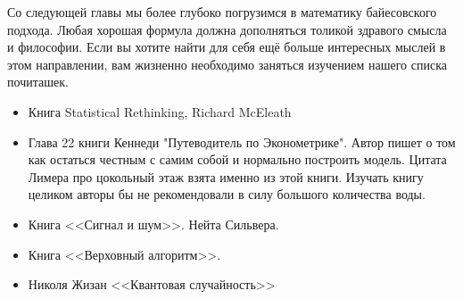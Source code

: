 \documentclass[12pt, a4paper, oneside]{extreport}
\theoremstyle{plain}              %
\theoremstyle{definition}         %
\begin{document}
Со следующей главы мы более глубоко погрузимся в математику байесовского подхода. Любая хорошая формула должна дополняться толикой здравого смысла и философии. Если вы хотите найти для себя ещё больше интересных мыслей в этом направлении, вам жизненно необходимо заняться изучением нашего списка почиташек.


\begin{itemize}

\item   Книга Statistical Rethinking, Richard McEleath

\item  Глава 22 книги Кеннеди "Путеводитель по Эконометрике". Автор пишет о том как остаться честным с самим собой и нормально построить модель. Цитата Лимера про цокольный этаж взята именно из этой книги. Изучать книгу целиком авторы бы не рекомендовали в силу большого количества воды. 

\item Книга <<Сигнал и шум>>. Нейта Сильвера. 

\item Книга <<Верховный алгоритм>>. 

\item  Николя Жизан <<Квантовая случайность>> 
\end{itemize}
\end{document}
